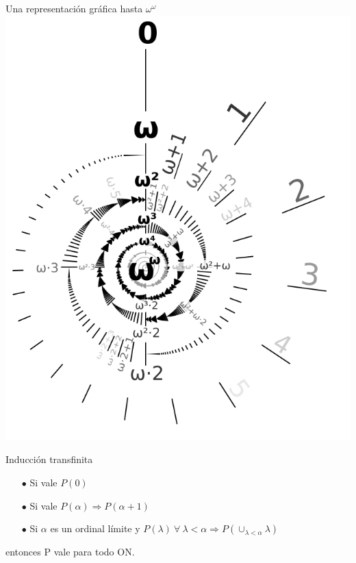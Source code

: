 \documentclass[10pt,spanish]{beamer}
\begin{document}
\begin{frame}{Una representación gráfica hasta $\omega^\omega$}
	\includegraphics[scale=0.42]{spiral.png}
\end{frame}


\begin{frame}{Inducción transfinita}



\begin{itemize}
	\item[$\bullet$]Si vale $P(0)$
	\item[$\bullet$]Si vale $P(\alpha) \Rightarrow P(\alpha + 1)$
	\item[$\bullet$]Si $\alpha$ es un ordinal límite y $P(\lambda)\ \forall\ \lambda < \alpha \Rightarrow P(\cup_{\lambda<\alpha} \lambda)$
\end{itemize}

entonces P vale para todo ON.


\end{frame}
\end{document}
